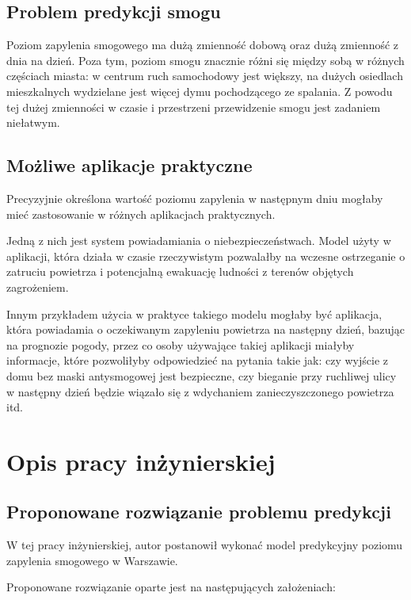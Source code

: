 \documentclass[a4paper,12pt,twoside,openany]{report}
\begin{document}
\section{Problem predykcji smogu}

Poziom zapylenia smogowego ma dużą zmienność dobową oraz dużą 
zmienność z dnia na dzień. Poza tym, poziom smogu znacznie różni się między sobą w różnych częściach miasta: w centrum ruch samochodowy jest większy, na dużych osiedlach mieszkalnych wydzielane jest więcej dymu pochodzącego ze spalania. Z powodu tej dużej zmienności w czasie i przestrzeni przewidzenie smogu jest zadaniem niełatwym.

\section{Możliwe aplikacje praktyczne}
Precyzyjnie określona wartość poziomu zapylenia w następnym dniu mogłaby mieć zastosowanie w różnych aplikacjach praktycznych.

Jedną z nich jest system powiadamiania o niebezpieczeństwach. Model użyty w aplikacji, która działa w czasie rzeczywistym pozwalałby na wczesne ostrzeganie o zatruciu powietrza i potencjalną ewakuację ludności z terenów objętych zagrożeniem.

Innym przykładem użycia w praktyce takiego modelu mogłaby być aplikacja, która powiadamia o oczekiwanym zapyleniu powietrza na następny dzień, bazując na prognozie pogody, przez co osoby używające takiej aplikacji miałyby informacje, które pozwoliłyby odpowiedzieć na pytania takie jak: czy wyjście z domu bez maski antysmogowej jest bezpieczne, czy bieganie przy ruchliwej ulicy w następny dzień będzie wiązało się z wdychaniem zanieczyszczonego powietrza itd.

\chapter{Opis pracy inżynierskiej}

\section{Proponowane rozwiązanie problemu predykcji}

W tej pracy inżynierskiej, autor postanowił wykonać model predykcyjny poziomu zapylenia smogowego w Warszawie.

Proponowane rozwiązanie oparte jest na następujących założeniach:
\end{document}
